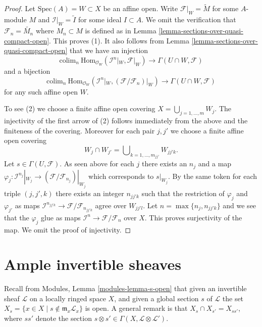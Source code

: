 \begin{proof}
Let $\text{Spec}(A) = W \subset X$ be an affine open.
Write $\mathcal{F}|_W = \widetilde{M}$ for some $A$-module $M$
and $\mathcal{I}|_W = \widetilde{I}$ for some ideal $I \subset A$.
We omit the verification that $\mathcal{F}_n = \widetilde{M_n}$ where
$M_n \subset M$ is defined as in
Lemma \ref{lemma-sections-over-quasi-compact-open}.
This proves (1). It also follows from
Lemma \ref{lemma-sections-over-quasi-compact-open}
that we have an injection
$$
\text{colim}_n\  \text{Hom}_{\mathcal{O}_W}(
\mathcal{I}^n|_W, \mathcal{F}|_W)
\longrightarrow
\Gamma(U \cap W, \mathcal{F})
$$
and a bijection
$$
\text{colim}_n\  \text{Hom}_{\mathcal{O}_W}(
\mathcal{I}^n|_W, (\mathcal{F}/\mathcal{F}_n)|_W)
\longrightarrow
\Gamma(U \cap W, \mathcal{F})
$$
for any such affine open $W$.

\medskip\noindent
To see (2) we choose a finite affine open covering
$X = \bigcup_{j = 1, \ldots, m} W_j$.
The injectivity of the first arrow of (2) follows immediately from
the above and the finiteness of the covering.
Moreover for each pair
$j, j'$ we choose a finite affine open covering
$$
W_j \cap W_{j'} = \bigcup\nolimits_{k = 1, \ldots, m_{jj'}} W_{jj'k}.
$$
Let $s \in \Gamma(U, \mathcal{F})$. As seen above for each $j$ there exists
an $n_j$ and a map
$\varphi_j : \mathcal{I}^{n_j}|_{W_j} \to
(\mathcal{F}/\mathcal{F}_{n_j})|_{W_j}$
which corresponds to $s|_{W_j}$.
By the same token for each triple $(j, j', k)$ there exists an integer
$n_{jj'k}$ such that the restriction of $\varphi_j$ and $\varphi_{j'}$
as maps $\mathcal{I}^{n_{jj'k}} \to \mathcal{F}/\mathcal{F}_{n_{jj'k}}$
agree over $W_{jj'l}$. Let $n = \max\{n_j, n_{jj'k}\}$ and we see that
the $\varphi_j$ glue as maps
$\mathcal{I}^n \to \mathcal{F}/\mathcal{F}_n$ over $X$.
This proves surjectivity of the map. We omit the proof of injectivity.
\end{proof}












\section{Ample invertible sheaves}
\label{section-ample}

\noindent
Recall from Modules, Lemma \ref{modules-lemma-s-open}
that given an invertible sheaf $\mathcal{L}$ on a locally ringed
space $X$, and given a global section $s$ of $\mathcal{L}$
the set $X_s = \{x \in X \mid s \not \in \mathfrak m_x\mathcal{L}_x\}$
is open. A general remark is that
$X_s \cap X_{s'} = X_{ss'}$, where $ss'$ denote
the section $s \otimes s' \in \Gamma(X, \mathcal{L}\otimes \mathcal{L}')$.

